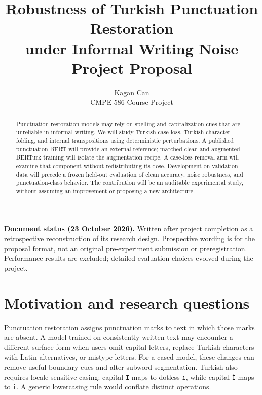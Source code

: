 \documentclass{article}
\title{Robustness of Turkish Punctuation Restoration\\under Informal Writing Noise\\[0.3em]
{\large Project Proposal}}
\author{Kagan Can\\CMPE 586 Course Project
\ifdefined\CourseSubmission\fi
}
\begin{document}
\maketitle

\begin{abstract}
Punctuation restoration models may rely on spelling and capitalization cues
that are unreliable in informal writing. We will study Turkish case loss,
Turkish character folding, and internal transpositions using deterministic
perturbations. A published punctuation BERT will provide an external reference;
matched clean and augmented BERTurk training will isolate the augmentation
recipe. A case-loss removal arm will examine that component without
redistributing its dose. Development on validation data will precede a frozen
held-out evaluation of clean accuracy, noise robustness, and punctuation-class
behavior. The contribution will be an auditable experimental study, without
assuming an improvement or proposing a new architecture.
\end{abstract}

\noindent\textbf{Document status (23 October 2026).}
Written after project completion as a retrospective reconstruction of its
research design. Prospective wording is for the proposal format, not an original
pre-experiment submission or preregistration. Performance results are excluded;
detailed evaluation choices evolved during the project.

\section{Motivation and research questions}
Punctuation restoration assigns punctuation marks to text in which those marks
are absent. A model trained on consistently written text may encounter a
different surface form when users omit capital letters, replace Turkish
characters with Latin alternatives, or mistype letters. For a cased model,
these changes can remove useful boundary cues and alter subword segmentation.
Turkish also requires locale-sensitive casing: capital \texttt{I} maps to
dotless \texttt{\i}, while capital \texttt{\.{I}} maps to \texttt{i}.
A generic lowercasing rule would conflate distinct operations.
\end{document}

